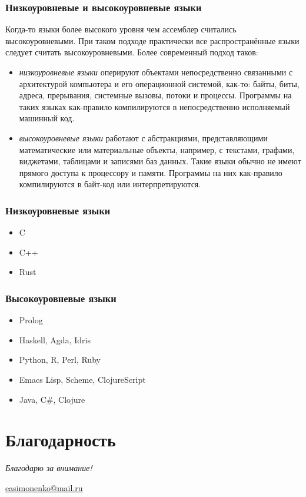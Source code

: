 \documentclass[9pt,pdf]{beamer}
\begin{document}
\begin{frame}
	\frametitle{Низкоуровневые и высокоуровневые языки}
	Когда-то языки более высокого уровня чем ассемблер считались высокоуровневыми. При таком подходе практически все распространённые языки следует считать высокоуровневыми. Более современный подход таков:
	\begin{itemize}
		\item \textit{низкоуровневые языки} оперируют объектами непосредственно связанными с архитектурой компьютера и его операционной системой, как-то: байты, биты, адреса, прерывания, системные вызовы, потоки и процессы. Программы на таких языках как-правило компилируются в непосредственно исполняемый машинный код.
		\item \textit{высокоуровневые языки} работают с абстракциями, представляющими математические или материальные объекты, например, с текстами, графами, виджетами, таблицами и записями баз данных. Такие языки обычно не имеют прямого доступа к процессору и памяти. Программы на них как-правило компилируются в байт-код или интерпретируются.
	\end{itemize}
\end{frame}

\begin{frame}
	\frametitle{Низкоуровневые языки}
	\begin{itemize}
		\item C
		\item C++
		\item Rust
	\end{itemize}
\end{frame}

\begin{frame}
	\frametitle{Высокоуровневые языки}
	\begin{itemize}
		\item Prolog
		\item Haskell, Agda, Idris
		\item Python, R, Perl, Ruby
		\item Emacs Lisp, Scheme, ClojureScript
		\item Java, C\#, Clojure
	\end{itemize}
\end{frame}


\section*{Благодарность}

\begin{frame}
\center

\textit{Благодарю за внимание!}

\textbf{\textsl{\inserttitle}}

\textsl{\insertsubtitle}

\insertauthor

\url{easimonenko@mail.ru}
\end{frame}
\end{document}
